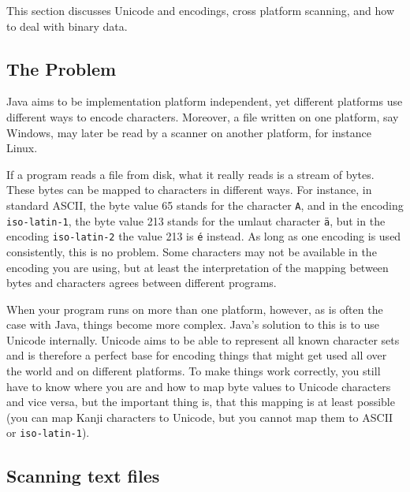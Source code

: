 
This section discusses Unicode and encodings, cross platform scanning,
and how to deal with binary data.

\subsection{The Problem}\label{the-problem}

Java aims to be implementation platform independent, yet different
platforms use different ways to encode characters. Moreover, a file
written on one platform, say Windows, may later be read by a scanner on
another platform, for instance Linux.

If a program reads a file from disk, what it really reads is a stream of
bytes. These bytes can be mapped to characters in different ways. For
instance, in standard ASCII, the byte value 65 stands for the character
\texttt{A}, and in the encoding \texttt{iso-latin-1}, the byte value 213
stands for the umlaut character \texttt{ä}, but in the encoding
\texttt{iso-latin-2} the value 213 is \texttt{é} instead. As long as one
encoding is used consistently, this is no problem. Some characters may
not be available in the encoding you are using, but at least the
interpretation of the mapping between bytes and characters agrees
between different programs.

When your program runs on more than one platform, however, as is often
the case with Java, things become more complex. Java's solution to this
is to use Unicode internally. Unicode aims to be able to represent all
known character sets and is therefore a perfect base for encoding things
that might get used all over the world and on different platforms. To
make things work correctly, you still have to know where you are and how
to map byte values to Unicode characters and vice versa, but the
important thing is, that this mapping is at least possible (you can map
Kanji characters to Unicode, but you cannot map them to ASCII or
\texttt{iso-latin-1}).

\subsection{Scanning text files}\label{scanning-text-files}

